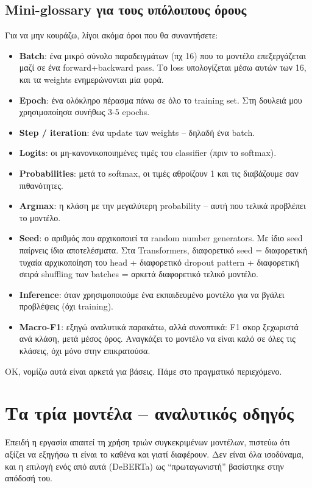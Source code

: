 \documentclass[12pt]{fphw}
\begin{document}
\subsection{Mini-glossary για τους υπόλοιπους όρους}

Για να μην κουράζω, λίγοι ακόμα όροι που θα συναντήσετε:

\begin{itemize}
    \item \textbf{Batch}: ένα μικρό σύνολο παραδειγμάτων (πχ 16) που το μοντέλο επεξεργάζεται μαζί σε ένα forward+backward pass. Το loss υπολογίζεται μέσω αυτών των 16, και τα weights ενημερώνονται μία φορά.
    \item \textbf{Epoch}: ένα ολόκληρο πέρασμα πάνω σε όλο το training set. Στη δουλειά μου χρησιμοποίησα συνήθως 3-5 epochs.
    \item \textbf{Step / iteration}: ένα update των weights -- δηλαδή ένα batch.
    \item \textbf{Logits}: οι μη-κανονικοποιημένες τιμές του classifier (πριν το softmax).
    \item \textbf{Probabilities}: μετά το softmax, οι τιμές αθροίζουν 1 και τις διαβάζουμε σαν πιθανότητες.
    \item \textbf{Argmax}: η κλάση με την μεγαλύτερη probability -- αυτή που τελικά προβλέπει το μοντέλο.
    \item \textbf{Seed}: ο αριθμός που αρχικοποιεί τα random number generators. Με ίδιο seed παίρνεις ίδια αποτελέσματα. Στα Transformers, διαφορετικό seed = διαφορετική τυχαία αρχικοποίηση του head + διαφορετικό dropout pattern + διαφορετική σειρά shuffling των batches = αρκετά διαφορετικό τελικό μοντέλο.
    \item \textbf{Inference}: όταν χρησιμοποιούμε ένα εκπαιδευμένο μοντέλο για να βγάλει προβλέψεις (όχι training).
    \item \textbf{Macro-F1}: εξηγώ αναλυτικά παρακάτω, αλλά συνοπτικά: F1 σκορ ξεχωριστά ανά κλάση, μετά μέσος όρος. Αναγκάζει το μοντέλο να είναι καλό σε όλες τις κλάσεις, όχι μόνο στην επικρατούσα.
\end{itemize}

OK, νομίζω αυτά είναι αρκετά για βάσεις. Πάμε στο πραγματικό περιεχόμενο.

\section{Τα τρία μοντέλα -- αναλυτικός οδηγός}

Επειδή η εργασία απαιτεί τη χρήση τριών συγκεκριμένων μοντέλων, πιστεύω ότι αξίζει να εξηγήσω τι είναι το καθένα και γιατί διαφέρουν. Δεν είναι όλα ισοδύναμα, και η επιλογή ενός από αυτά (DeBERTa) ως ``πρωταγωνιστή'' βασίστηκε στην απόδοσή του.
\end{document}
